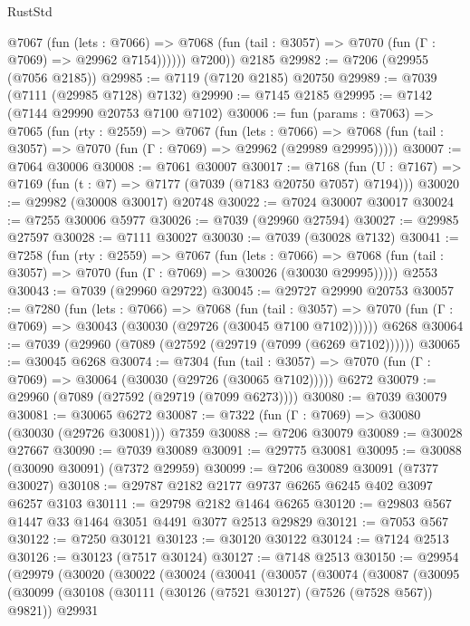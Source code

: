 \begin{lexlean}{RustStd}
\begin{coremodule}
            @7067
              (fun (lets : @7066) =>
              @7068 (fun (tail : @3057) => @7070 (fun (Γ : @7069) => @29962 @7154))))))
        @7200))
    @2185
@29982 := @7206 (@29955 (@7056 @2185))
@29985 := @7119 (@7120 @2185) @20750
@29989 := @7039 (@7111 (@29985 @7128) @7132)
@29990 := @7145 @2185
@29995 := @7142 (@7144 @29990 @20753 @7100 @7102)
@30006 := fun (params : @7063) =>
  @7065
    (fun (rty : @2559) =>
    @7067
      (fun (lets : @7066) =>
      @7068 (fun (tail : @3057) => @7070 (fun (Γ : @7069) => @29962 (@29989 @29995)))))
@30007 := @7064 @30006
@30008 := @7061 @30007
@30017 := @7168
    (fun (U : @7167) => @7169 (fun (t : @7) => @7177 (@7039 (@7183 @20750 @7057) @7194)))
@30020 := @29982 (@30008 @30017) @20748
@30022 := @7024 @30007 @30017
@30024 := @7255 @30006 @5977
@30026 := @7039 (@29960 @27594)
@30027 := @29985 @27597
@30028 := @7111 @30027
@30030 := @7039 (@30028 @7132)
@30041 := @7258
    (fun (rty : @2559) =>
    @7067
      (fun (lets : @7066) =>
      @7068 (fun (tail : @3057) => @7070 (fun (Γ : @7069) => @30026 (@30030 @29995)))))
    @2553
@30043 := @7039 (@29960 @29722)
@30045 := @29727 @29990 @20753
@30057 := @7280
    (fun (lets : @7066) =>
    @7068
      (fun (tail : @3057) =>
      @7070 (fun (Γ : @7069) => @30043 (@30030 (@29726 (@30045 @7100 @7102))))))
    @6268
@30064 := @7039 (@29960 (@7089 (@27592 (@29719 (@7099 (@6269 @7102))))))
@30065 := @30045 @6268
@30074 := @7304
    (fun (tail : @3057) => @7070 (fun (Γ : @7069) => @30064 (@30030 (@29726 (@30065 @7102)))))
    @6272
@30079 := @29960 (@7089 (@27592 (@29719 (@7099 @6273))))
@30080 := @7039 @30079
@30081 := @30065 @6272
@30087 := @7322 (fun (Γ : @7069) => @30080 (@30030 (@29726 @30081))) @7359
@30088 := @7206 @30079
@30089 := @30028 @27667
@30090 := @7039 @30089
@30091 := @29775 @30081
@30095 := @30088 (@30090 @30091) (@7372 @29959)
@30099 := @7206 @30089 @30091 (@7377 @30027)
@30108 := @29787 @2182 @2177 @9737 @6265 @6245 @402 @3097 @6257 @3103
@30111 := @29798 @2182 @1464 @6265
@30120 := @29803 @567 @1447 @33 @1464 @3051 @4491 @3077 @2513 @29829
@30121 := @7053 @567
@30122 := @7250 @30121
@30123 := @30120 @30122
@30124 := @7124 @2513
@30126 := @30123 (@7517 @30124)
@30127 := @7148 @2513
@30150 := @29954
    (@29979
      (@30020
        (@30022
          (@30024
            (@30041
              (@30057
                (@30074
                  (@30087
                    (@30095
                      (@30099
                        (@30108
                          (@30111 (@30126 (@7521 @30127) (@7526 (@7528 @567)) @9821))
                          @29931

\end{coremodule}
\end{lexlean}
